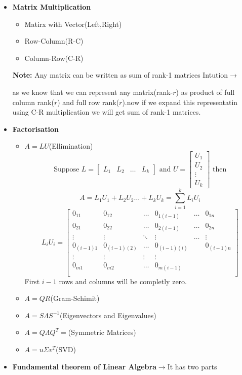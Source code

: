 \documentclass[a4paper]{article}
\numberwithin{equation}{section}
\begin{document}
\begin{itemize}
    \item \textbf{Matrix Multiplication}
        \begin{itemize}
            \item Matirx with Vector(Left,Right)
            \item Row-Column(R-C)
            \item Column-Row(C-R)
        \end{itemize}
    \textbf{Note: }Any matrix can be written as sum of rank-1 matrices Intution$\rightarrow$

    as we know that we can represent any matrix(rank-$r$) as product of full column rank($r$) and full row rank($r$).now if we expand this representatin using C-R multiplication we will get sum of rank-1 matrices.

    \item \textbf{Factorisation}
        \begin{itemize}
            \item $A=LU$(Ellimination)
            \[\text{Suppose } L=\begin{bmatrix}
                L_1&L_2&\dots&L_k
            \end{bmatrix} \text{ and } U=\begin{bmatrix}
                U_1\\U_2\\\vdots\\U_k
            \end{bmatrix} \text{ then}\]
            \[A=L_1U_1+L_2U_2\dots+L_kU_k=\sum_{i=1}^{k}L_iU_i\]
            \[L_iU_i=\begin{bmatrix}
                0_{11}&0_{12}&\dots&0_{1(i-1)}&\dots&0_{1n}\\
                0_{21}&0_{22}&\dots&0_{2(i-1)}&\dots&0_{2n}\\
                \vdots&\vdots&\ddots&\vdots&\dots&\vdots\\
                0_{(i-1)1}&0_{(i-1)(2)}&\dots&0_{(i-1)(i)}&&0_{(i-1)n}\\
                \vdots&\vdots&\vdots&\vdots\\
                0_{m1}&0_{m2}&\dots&0_{m(i-1)}\\
            \end{bmatrix}\]
            First $i-1$ rows and columns will be completly zero.
            \item $A=QR$(Gram-Schimit)
            \item $A=S\varLambda S^{-1}$(Eigenvectors and Eigenvalues)
            \item $A=Q\varLambda Q^T=$(Symmetric Matrices)
            \item $A=u\Sigma v^T$(SVD)
        \end{itemize}
    \item \textbf{Fundamental theorem of Linear Algebra$\rightarrow$}It has two parts


\end{itemize}
\end{document}
